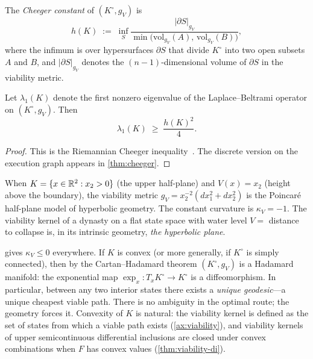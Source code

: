 \begin{definition}
\label{def:cheeger-viab}
The \emph{Cheeger constant} of $(K^\circ, g_V)$ is
\[
  h(K)
  \;:=\;
  \inf_{S}
  \frac{|\partial S|_{g_V}}
  {\min\!\bigl(\mathrm{vol}_{g_V}(A),\,
  \mathrm{vol}_{g_V}(B)\bigr)},
\]
where the infimum is over hypersurfaces $\partial S$ that divide
$K^\circ$ into two open subsets $A$ and $B$, and $|\partial S|_{g_V}$
denotes the $(n-1)$-dimensional volume of $\partial S$ in the
viability metric.
\end{definition}

\begin{theorem}\label{thm:cheeger-viab}
Let $\lambda_1(K)$ denote the first nonzero eigenvalue of the
Laplace--Beltrami operator on $(K^\circ, g_V)$.  Then
\[
  \lambda_1(K) \;\geq\; \frac{h(K)^2}{4}.
\]
\end{theorem}

\begin{proof}
This is the Riemannian Cheeger inequality~\cite{cheeger}.
The discrete version on the execution graph appears in
\cref{thm:cheeger}.
\end{proof}

\begin{remark}\label{rem:poincare}
When $K = \{x \in \mathbb{R}^2 : x_2 > 0\}$ (the upper half-plane) and
$V(x) = x_2$ (height above the boundary), the viability metric
$g_V = x_2^{-2}(dx_1^2 + dx_2^2)$ is the Poincar\'e half-plane
model of hyperbolic geometry.  The constant curvature is
$\kappa_V = -1$.  The viability kernel of a dynasty on a flat
state space with water level $V = $ distance to collapse is, in its
intrinsic geometry, \emph{the hyperbolic plane}.
\end{remark}

\begin{remark}\label{rem:cartan-hadamard}
 gives $\kappa_V \leq 0$ everywhere.
If $K$ is convex (or more generally, if $K^\circ$ is simply
connected), then by the Cartan--Hadamard theorem $(K^\circ, g_V)$
is a Hadamard manifold: the exponential map
$\exp_x: T_x K^\circ \to K^\circ$ is a diffeomorphism.
In particular, between any two interior states there exists a
\emph{unique geodesic}---a unique cheapest viable path.
There is no ambiguity in the optimal route; the geometry forces it.
Convexity of $K$ is natural: the viability kernel is defined as
the set of states from which a viable path exists
(\cref{ax:viability}), and viability kernels of upper semicontinuous
differential inclusions are closed under convex combinations when
$F$ has convex values (\cref{thm:viability-di}).
\end{remark}


